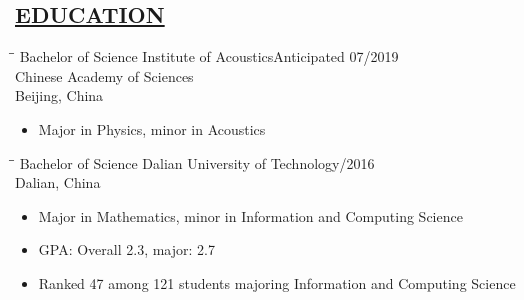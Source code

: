 \documentclass{res} %
\begin{document}

\address{Email: karel.wang@gmail.com, \ Phone: +86 18130056757 
\\
\\
Current Address: University of Chinese Academy of Sciences,\\ \qquad \qquad 
\qquad {} Huaibeizhuang, Huairou District,\\ \qquad \qquad 
\qquad \qquad Beijing, China}

\begin{resume}
\section{\underline{EDUCATION}}


\vspace{-0.02in}	
\begin{tabbing}
    \hspace{2.2in}\= \hspace{2.8in}\= \kill %
    Bachelor of Science   \>Institute of Acoustics\>Anticipated 07/2019  \\
                        \> Chinese Academy of Sciences \>\\
                        \> Beijing, China\>\\
    \end{tabbing}\vspace{-22pt}      %
\vspace{+0.05in}
\begin{itemize}
  \item Major in Physics, minor in Acoustics

\end{itemize}
\vspace{-0.1in}

\vspace{-0.02in}	
\begin{tabbing}
    \hspace{2.2in}\= \hspace{2.8in}\= \kill %
    Bachelor of Science   \>Dalian University of Technology/2016  \\
                        \> Dalian, China \>\\
    \end{tabbing}\vspace{-22pt}      %
\vspace{+0.05in}
\begin{itemize}
  \item Major in Mathematics, minor in Information and Computing Science
  \item GPA: Overall 2.3, major: 2.7
  \item Ranked 47 among 121 students majoring Information and Computing Science
\end{itemize}
\vspace{-0.1in}


\end{resume}
\end{document}
